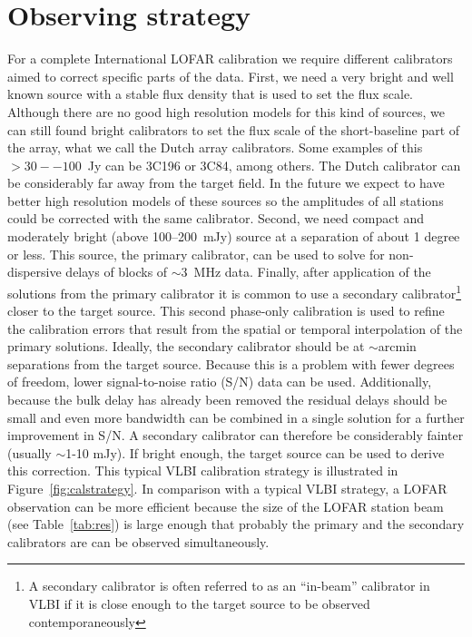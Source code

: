 \documentclass[graybox]{svmult}
\begin{document}
\section{Observing strategy}
\label{sect:obsstrat}
For a complete International LOFAR calibration we require different calibrators
aimed to correct specific parts of the data. First, we need a very bright and
well known source with a stable flux density that is used to set the flux scale.
Although there are no good high resolution models for this kind of sources, we
can still found bright calibrators to set the flux scale of the short-baseline
part of the array, what we call the Dutch array calibrators. Some examples of
this $>30--100$~Jy can be 3C196 or 3C84, among others. The Dutch calibrator can
be considerably far away from the target field. In the future we expect to have
better high resolution models of these sources so the amplitudes of all stations
could be corrected with the same calibrator. Second, we need compact and
moderately bright (above 100--200~mJy) source at a separation of about 1 degree
or less. This source, the primary calibrator, can be used to solve for
non-dispersive delays of blocks of $\sim3$~MHz data. Finally, after application
of the solutions from the primary calibrator it is common to use a secondary
calibrator\footnote{A secondary calibrator is often referred to as an
``in-beam'' calibrator in VLBI if it is close enough to the target source to be
observed contemporaneously} closer to the target source. This second phase-only
calibration is used to refine the calibration errors that result from the
spatial or temporal interpolation of the primary solutions.  Ideally, the
secondary calibrator should be at $\sim$arcmin separations from the target
source.  Because this is a problem with fewer degrees of freedom, lower
signal-to-noise ratio (S/N) data can be used.  Additionally, because the bulk
delay has already been removed the residual delays should be small and even more
bandwidth can be combined in a single solution for a further improvement in S/N.
A secondary calibrator can therefore be considerably fainter (usually $\sim$1-10
mJy). If bright enough, the target source can be used to derive this correction.
This typical VLBI calibration strategy is illustrated in
Figure~\ref{fig:calstrategy}. In comparison with a typical VLBI strategy, a
LOFAR observation can be more efficient because the size of the LOFAR station
beam (see Table~\ref{tab:res}) is large enough that probably the primary and the
secondary calibrators are can be observed simultaneously.
\end{document}
